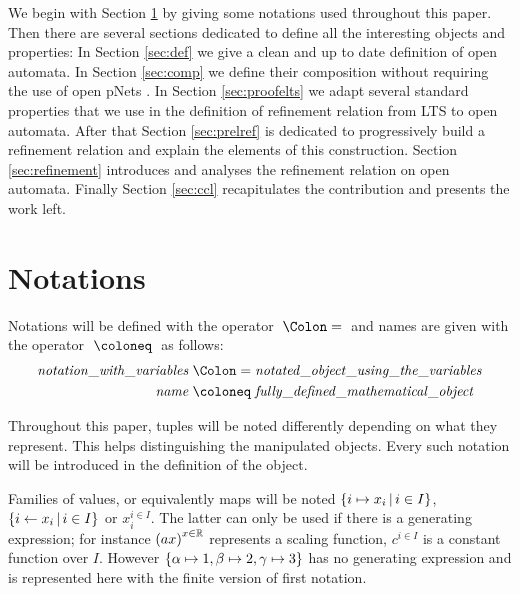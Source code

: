 \documentclass{article}
\begin{document}
We begin with Section \ref{sec:notations} by giving some notations used throughout this paper.
Then there are several sections dedicated to define all the interesting objects and properties:
In Section \ref{sec:def} we give a clean and up to date definition of open automata.
In Section \ref{sec:comp} we define their composition without requiring the use of open pNets .
In Section \ref{sec:proofelts} we adapt several standard properties that we use in the definition of refinement relation from LTS to open automata.
After that Section \ref{sec:prelref} is dedicated to progressively build a refinement relation and explain the elements of this construction.
Section \ref{sec:refinement} introduces and analyses the refinement relation on open automata.
Finally Section \ref{sec:ccl} recapitulates the contribution and presents the work left.


\section{Notations}\label{sec:notations}
Notations will be defined with the operator \(\defnotation\) and names are given with the operator \(\defobject\) as follows:
\begin{align*}
	\mathit{notation\_with\_variables} & \defnotation \mathit{notated\_object\_using\_the\_variables} \\
	\mathit{name} & \defobject \mathit{fully\_defined\_mathematical\_object}
\end{align*}

Throughout this paper, tuples will be noted differently depending on what they represent.
This helps distinguishing the manipulated objects.
Every such notation will be introduced in the definition of the object.

Families of values, or equivalently maps will be noted \({\left\{i \mapsto x_i\,\middle|\, i \in I\right\}}\), \({\left\{i \gets x_i\,\middle|\, i \in I\right\}}\) or \(x_i^{i \in I}\).
The latter can only be used if there is a generating expression; for instance \({\left(ax\right)}^{x \in \mathbb{R}}\) represents a scaling function, \(c^{i \in I}\) is a constant function over \(I\).
However \({\left\{\alpha \mapsto 1, \beta \mapsto 2, \gamma \mapsto 3\right\}}\) has no generating expression and is represented here with the finite version of first notation.
\end{document}
